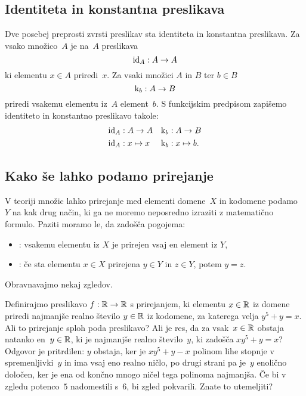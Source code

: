 \subsection{Identiteta in konstantna preslikava}
\label{sec:ident-konst-presl}

Dve posebej preprosti zvrsti preslikav sta identiteta in konstantna preslikava.
Za vsako množico~$A$ je  na~$A$ preslikava
%
\begin{equation*}
  \id[A] : A \to A
\end{equation*}
%
ki elementu $x \in A$ priredi~$x$.
%
Za vsaki množici $A$ in $B$ ter $b \in B$ 
%
\begin{equation*}
  \konst{b} : A \to B
\end{equation*}
%
priredi vsakemu elementu iz~$A$ element~$b$.
%
S funkcijskim predpisom zapišemo identiteto in konstantno preslikavo takole:
%
\begin{align*}
  \id[A] &: A \to A
  &
  \konst{b} &: A \to B
  \\
  \id[A] &: x \mapsto x
  &
  \konst{b} &: x \mapsto b.
\end{align*}

\subsection{Kako še lahko podamo prirejanje}
\label{sec:drugi-nacin-prirejanje}

V teoriji množic lahko prirejanje med elementi domene~$X$ in kodomene podamo~$Y$ na kak drug način, ki ga ne moremo neposredno izraziti z matematično formulo. Paziti moramo le, da zadošča pogojema:
%
\begin{itemize}
\item {}: vsakemu elementu iz $X$ je prirejen vsaj en element iz $Y$,
\item {}: če sta elementu $x \in X$ prirejena $y \in Y$ in $z \in Y$, potem $y = z$.
\end{itemize}
%
Obravnavajmo nekaj zgledov.

\begin{zgled}
  \label{zgled:prirejanje-opis}
  Definirajmo preslikavo $f : \RR \to \RR$ s prirejanjem, ki elementu $x \in \RR$ iz domene priredi najmanjše realno število $y \in \RR$ iz kodomene, za katerega velja $y^5 + y = x$.
  Ali to prirejanje sploh poda preslikavo? Ali je res, da za vsak~$x \in \RR$ obstaja natanko en~$y \in \RR$, ki je najmanjše realno število~$y$, ki zadošča $x y^5 + y = x$? Odgovor je pritrdilen: $y$ obstaja, ker je $x y^5 + y - x$ polinom lihe stopnje v spremenljivki~$y$ in ima vsaj eno realno ničlo, po drugi strani pa je~$y$ enolično določen, ker je ena od končno mnogo ničel tega polinoma najmanjša.
  Če bi v zgledu potenco~$5$ nadomestili s~$6$, bi zgled pokvarili. Znate to utemeljiti?
\end{zgled}

